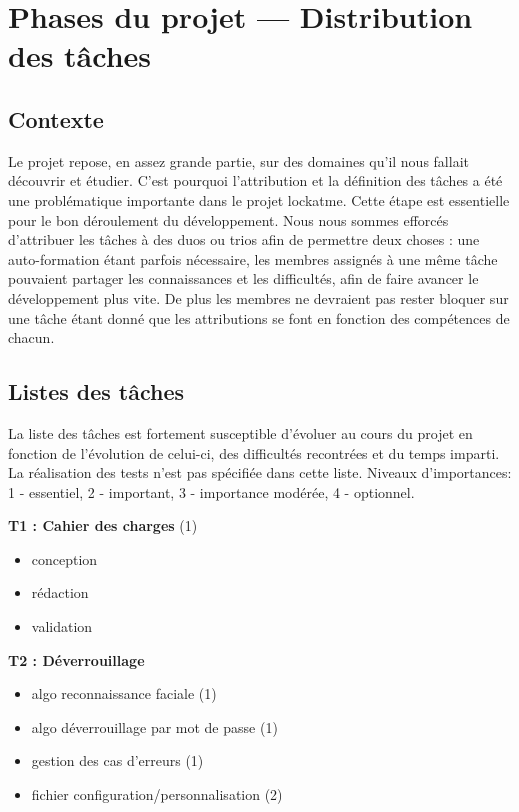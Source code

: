 \chapter{Phases du projet --- Distribution des tâches}
\newpage

\section{Contexte}
Le projet repose, en assez grande partie, sur des domaines qu’il nous
fallait découvrir et étudier. C’est pourquoi l’attribution et la définition
des tâches a été une problématique importante dans le projet lockatme.
Cette étape est essentielle pour le bon déroulement du développement.
Nous nous sommes efforcés d’attribuer les tâches à des duos ou trios afin de
permettre deux choses : une auto-formation étant parfois nécessaire, les
membres assignés à une même tâche pouvaient partager les connaissances et les
difficultés, afin de faire avancer le développement plus vite. De plus les
membres ne devraient pas rester bloquer sur une tâche étant donné que les
attributions se font en fonction des compétences de chacun.

\section{Listes des tâches}
La liste des tâches est fortement susceptible d’évoluer au cours du projet en
fonction de l’évolution de celui-ci, des difficultés recontrées et du temps
imparti. La réalisation des tests n’est pas spécifiée dans cette liste.
Niveaux d’importances: 1 - essentiel, 2 - important, 3 - importance modérée,
4 - optionnel.

\vspace{0.5cm}

\textbf{T1 : Cahier des charges} (1)
\begin{itemize}
  \item{conception}
  \item{rédaction}
  \item{validation}
\end{itemize}

\textbf{T2 : Déverrouillage}
\begin{itemize}
  \item{algo reconnaissance faciale (1)}
  \item{algo déverrouillage par mot de passe (1)}
  \item{gestion des cas d’erreurs (1)}
  \item{fichier configuration/personnalisation (2)}
\end{itemize}

